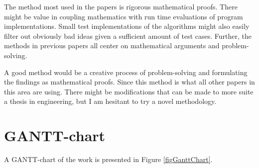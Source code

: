 \documentclass[msc,lith,english]{liuthesis}
\begin{document}
The method most used in the papers is rigorous mathematical proofs. There might be value in coupling mathematics with run time evaluations of program implementations.
Small test implementations of the algorithms might also easily filter out obviously bad ideas given a sufficient amount of test cases.
Further, the methods in previous papers all center on mathematical arguments and problem-solving.

A good method would be a creative process of problem-solving and formulating the findings as mathematical proofs.
Since this method is what all other papers in this area are using.
There might be modifications that can be made to more suite a thesis in engineering,
but I am hesitant to try a novel methodology.

\section{GANTT-chart}
A GANTT-chart of the work is presented in Figure \ref{figGanttChart}.
\end{document}
